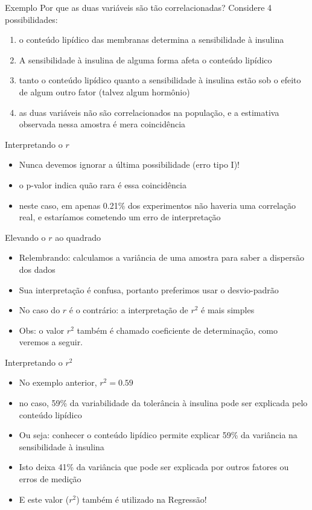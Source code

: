 \documentclass{beamer}
\begin{document}
\begin{frame}{Exemplo}
  Por que as duas variáveis são tão correlacionadas? Considere 4
  possibilidades:
  \begin{enumerate}
  \item o conteúdo lipídico das membranas \alert<1>{determina} a
    sensibilidade à insulina
  \item A sensibilidade à insulina de alguma forma afeta o conteúdo lipídico
  \item tanto o conteúdo lipídico quanto a sensibilidade à insulina
    estão sob o efeito de \alert<3>{algum outro} fator (talvez algum hormônio)
  \item as duas variáveis não são correlacionados na população, e a
    estimativa observada nessa amostra é mera coincidência
  \end{enumerate}
\end{frame}

\begin{frame}{Interpretando o $r$}
  \begin{itemize}
  \item Nunca devemos ignorar a última possibilidade (erro tipo I)!
  \item o p-valor indica quão rara é essa coincidência
  \item neste caso, em apenas 0.21\% dos experimentos não haveria uma
    correlação real, e estaríamos cometendo um erro de interpretação
  \end{itemize}
\end{frame}

\begin{frame}{Elevando o $r$ ao quadrado}
  \begin{itemize}
  \item Relembrando: calculamos a variância de uma amostra para saber
    a dispersão dos dados
  \item Sua interpretação é confusa, portanto preferimos usar o
    desvio-padrão
  \item No caso do $r$ é o contrário: a interpretação de $r^2$ é mais simples
  \item Obs: o valor $r^2$ também é chamado \alert{coeficiente de
      determinação}, como veremos a seguir.
  \end{itemize}
\end{frame}

\begin{frame}{Interpretando o $r^2$}
  \begin{itemize}
  \item No exemplo anterior, $r^2 = 0.59$
  \item no caso, 59\% da variabilidade da tolerância à insulina pode
    ser explicada pelo conteúdo lipídico
  \item Ou seja: conhecer o conteúdo lipídico permite explicar 59\%
    da variância na sensibilidade à insulina
  \item Isto deixa 41\% da variância que pode ser explicada por outros
    fatores ou erros de medição
  \item E este valor ($r^2$) também é utilizado na Regressão!
  \end{itemize}
\end{frame}
\end{document}
